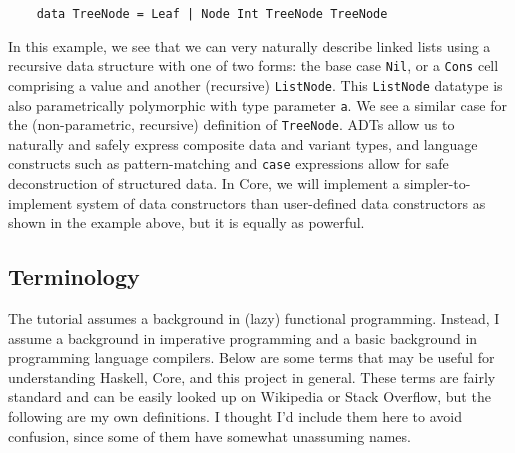 \begin{description}
\begin{verbatim}
    data TreeNode = Leaf | Node Int TreeNode TreeNode
  \end{verbatim}
  In this example, we see that we can very naturally describe linked lists using a recursive data structure with one of two forms: the base case \texttt{Nil}, or a \texttt{Cons} cell comprising a value and another (recursive) \texttt{ListNode}. This \texttt{ListNode} datatype is also parametrically polymorphic with type parameter \texttt{a}. We see a similar case for the (non-parametric, recursive) definition of \texttt{TreeNode}. ADTs allow us to naturally and safely express composite data and variant types, and language constructs such as pattern-matching and \texttt{case} expressions allow for safe deconstruction of structured data. In Core, we will implement a simpler-to-implement system of data constructors than user-defined data constructors as shown in the example above, but it is equally as powerful.
\end{description}

\subsection{Terminology}
\label{sec:terminology}
 
The tutorial assumes a background in (lazy) functional programming. Instead, I assume a background in imperative programming and a basic background in programming language compilers. Below are some terms that may be useful for understanding Haskell, Core, and this project in general. These terms are fairly standard and can be easily looked up on Wikipedia or Stack Overflow, but the following are my own definitions. I thought I'd include them here to avoid confusion, since some of them have somewhat unassuming names.

